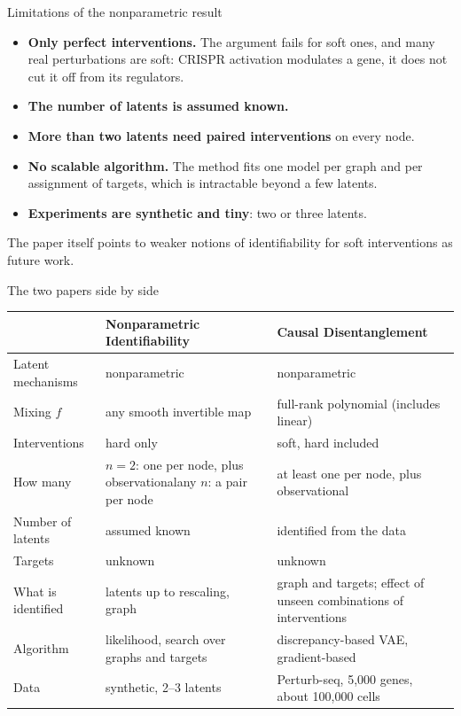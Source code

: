 \documentclass[11pt,aspectratio=169]{beamer}
\newcommand{\red}[1]{\textcolor{ETHRed}{#1}}
\begin{document}
\begin{frame}{Limitations of the nonparametric result}
	\begin{itemize}
		\item \textbf{Only perfect interventions.} The argument fails for soft ones, and many real perturbations are soft: CRISPR activation modulates a gene, it does not cut it off from its regulators.
		\medskip
		\item \textbf{The number of latents is assumed known.}
		\medskip
		\item \textbf{More than two latents need paired interventions} on every node.
		\medskip
		\item \textbf{No scalable algorithm.} The method fits one model per graph and per assignment of targets, which is intractable beyond a few latents.
		\medskip
		\item \textbf{Experiments are synthetic and tiny}: two or three latents.
	\end{itemize}
	\bigskip
	The paper itself points to weaker notions of identifiability for soft interventions as future work.
\end{frame}

\begin{frame}{The two papers side by side}
	\centering
	\renewcommand{\arraystretch}{1.25}
	{\scriptsize
	\begin{tabular}{@{}p{}p{}p{}@{}}
		\toprule
		& \textbf{Nonparametric Identifiability} & \textbf{Causal Disentanglement} \\
		\midrule
		Latent mechanisms & nonparametric & nonparametric \\
		Mixing $f$ & any smooth invertible map & \red{full-rank polynomial} (includes linear) \\
		Interventions & hard only & \red{soft}, hard included \\
		How many & $n=2$: one per node, plus observational\newline any $n$: a pair per node & at least one per node, plus observational \\
		Number of latents & assumed known & \red{identified from the data} \\
		Targets & unknown & unknown \\
		What is identified & latents up to rescaling, graph & graph and targets; effect of unseen combinations of interventions \\
		Algorithm & likelihood, search over graphs and targets & \red{discrepancy-based VAE}, gradient-based \\
		Data & synthetic, 2--3 latents & Perturb-seq, 5{,}000 genes, about 100{,}000 cells \\
		\bottomrule
	\end{tabular}}
\end{frame}
\end{document}
